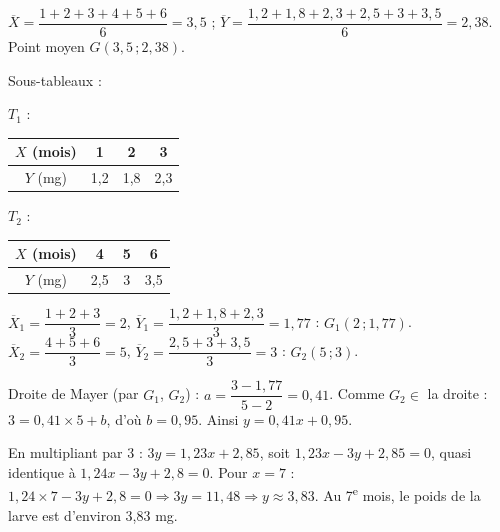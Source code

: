 \documentclass[11pt]{article}
\begin{document}
\begin{questions}
  \item $\overline{X} = \dfrac{1+2+3+4+5+6}{6} = 3{,}5$ ; $\overline{Y} = \dfrac{1{,}2 + 1{,}8 + 2{,}3 + 2{,}5 + 3 + 3{,}5}{6} = 2{,}38$. Point moyen $G(3{,}5\,;2{,}38)$.
  \item \begin{sousq}
    \item Sous-tableaux :
    \begin{center}\renewcommand{\arraystretch}{1.3}
    $T_1$ : \begin{tabular}{|c|c|c|c|}\hline $X$ (mois) & 1 & 2 & 3 \\\hline $Y$ (mg) & 1{,}2 & 1{,}8 & 2{,}3 \\\hline\end{tabular}\qquad
    $T_2$ : \begin{tabular}{|c|c|c|c|}\hline $X$ (mois) & 4 & 5 & 6 \\\hline $Y$ (mg) & 2{,}5 & 3 & 3{,}5 \\\hline\end{tabular}
    \end{center}
    \item $\overline{X}_1 = \dfrac{1+2+3}{3} = 2$, $\overline{Y}_1 = \dfrac{1{,}2 + 1{,}8 + 2{,}3}{3} = 1{,}77$ : $G_1(2\,;1{,}77)$. $\overline{X}_2 = \dfrac{4+5+6}{3} = 5$, $\overline{Y}_2 = \dfrac{2{,}5 + 3 + 3{,}5}{3} = 3$ : $G_2(5\,;3)$.
    \item Droite de Mayer (par $G_1$, $G_2$) : $a = \dfrac{3 - 1{,}77}{5 - 2} = 0{,}41$. Comme $G_2 \in$ la droite : $3 = 0{,}41\times 5 + b$, d'où $b = 0{,}95$. Ainsi $y = 0{,}41x + 0{,}95$.
  \end{sousq}
  \item En multipliant par 3 : $3y = 1{,}23x + 2{,}85$, soit $1{,}23x - 3y + 2{,}85 = 0$, quasi identique à $1{,}24x - 3y + 2{,}8 = 0$. Pour $x = 7$ : $1{,}24\times 7 - 3y + 2{,}8 = 0 \Rightarrow 3y = 11{,}48 \Rightarrow y \approx 3{,}83$. Au 7\textsuperscript{e} mois, le poids de la larve est d'environ 3,83 mg.
\end{questions}
\end{document}
